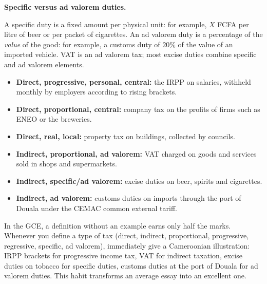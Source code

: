 \documentclass[11pt]{article}
\newcommand{\cle}[1]{{\popxbold\color{popdark}#1}}
\begin{document}
\textbf{Specific versus ad valorem duties.}\par
A \cle{specific duty} is a fixed amount per physical unit: for example, $X$ FCFA per litre of beer or per packet of cigarettes. An \cle{ad valorem duty} is a percentage of the \emph{value} of the good: for example, a customs duty of $20\%$ of the value of an imported vehicle. VAT is an ad valorem tax; most excise duties combine specific and ad valorem elements.

\begin{exemplebox}
\begin{itemize}
\item \textbf{Direct, progressive, personal, central:} the IRPP on salaries, withheld monthly by employers according to rising brackets.
\item \textbf{Direct, proportional, central:} company tax on the profits of firms such as ENEO or the breweries.
\item \textbf{Direct, real, local:} property tax on buildings, collected by councils.
\item \textbf{Indirect, proportional, ad valorem:} VAT charged on goods and services sold in shops and supermarkets.
\item \textbf{Indirect, specific/ad valorem:} excise duties on beer, spirits and cigarettes.
\item \textbf{Indirect, ad valorem:} customs duties on imports through the port of Douala under the CEMAC common external tariff.
\end{itemize}
\end{exemplebox}

\begin{attention}
In the GCE, a definition without an example earns only half the marks. Whenever you define a type of tax (direct, indirect, proportional, progressive, regressive, specific, ad valorem), immediately give a Cameroonian illustration: IRPP brackets for progressive income tax, VAT for indirect taxation, excise duties on tobacco for specific duties, customs duties at the port of Douala for ad valorem duties. This habit transforms an average essay into an excellent one.
\end{attention}
\end{document}
